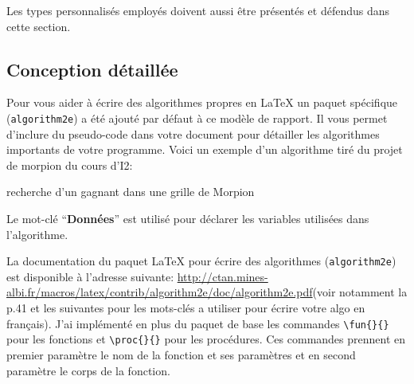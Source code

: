         Les types personnalisés employés doivent aussi être présentés et défendus dans cette section.
        
    \subsection{Conception détaillée}
        Pour vous aider à écrire des algorithmes propres en \LaTeX{} un paquet spécifique (\verb|algorithm2e|) a été ajouté par défaut à ce modèle de rapport.
        Il vous permet d'inclure du pseudo-code dans votre document pour détailler les algorithmes importants de votre programme.
        Voici un exemple d'un algorithme tiré du projet de morpion du cours d'I2:
        
        \begin{algorithm}[H]
            \SetAlgoLined
            \caption{recherche d'un gagnant dans une grille de Morpion}
        \end{algorithm}
        
        Le mot-clé \enquote{\textbf{Données}} est utilisé pour déclarer les variables utilisées dans l'algorithme.
        
        La documentation du paquet \LaTeX{} pour écrire des algorithmes (\verb|algorithm2e|) est disponible à l'adresse suivante: \url{http://ctan.mines-albi.fr/macros/latex/contrib/algorithm2e/doc/algorithm2e.pdf}(voir notamment la p.41 et les suivantes pour les mots-clés a utiliser pour écrire votre algo en français).
        J'ai implémenté en plus du paquet de base les commandes \verb|\fun{}{}| pour les fonctions et \verb|\proc{}{}| pour les procédures.
        Ces commandes prennent en premier paramètre le nom de la fonction et ses paramètres et en second paramètre le corps de la fonction.
